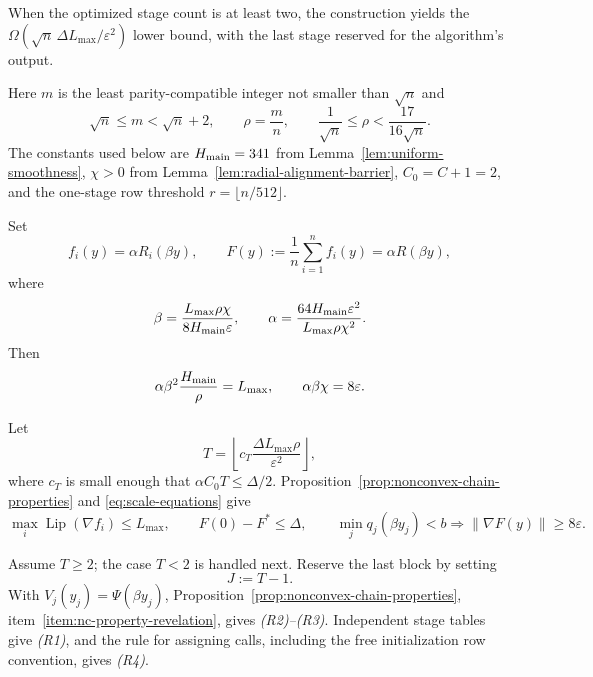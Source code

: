 \documentclass{article}
\theoremstyle{definition}
\begin{document}
When the optimized stage count is at least two, the construction yields the
$\Omega(\sqrt n\,\Delta L_{\max}/\varepsilon^2)$ lower bound, with the last
stage reserved for the algorithm's output.

Here $m$ is the least parity-compatible integer not smaller than $\sqrt n$ and
\begin{equation}
 \sqrt n\le m<\sqrt n+2,
 \qquad \rho=\frac mn,
 \qquad \frac1{\sqrt n}\le\rho<\frac{17}{16\sqrt n}.
 \label{eq:nonconvex-local-optimized-bias}
\end{equation}
The constants used below are $H_{\rm main}=341$ from
Lemma~\ref{lem:uniform-smoothness}, $\chi>0$ from
Lemma~\ref{lem:radial-alignment-barrier}, $C_0=C+1=2$, and the one-stage row
threshold $r=\lfloor n/512\rfloor$.

Set
\begin{equation}
    f_i(y)=\alpha R_i(\beta y),
    \qquad
    F(y):=\frac1n\sum_{i=1}^nf_i(y)=\alpha R(\beta y),
\end{equation}
where
\begin{equation}
    \beta=\frac{L_{\max}\rho\chi}{8H_{\rm main}\varepsilon},
 \qquad
    \alpha=\frac{64H_{\rm main}\varepsilon^2}{L_{\max}\rho\chi^2}.
 \label{eq:nonconvex-scales}
\end{equation}
Then
\begin{equation}
 \alpha\beta^2\frac {H_{\rm main}}\rho=L_{\max},
 \qquad
 \alpha\beta\chi=8\varepsilon.
 \label{eq:scale-equations}
\end{equation}

Let
\begin{equation}
 T=\left\lfloor
 c_T\frac{\Delta L_{\max}\rho}{\varepsilon^2}
 \right\rfloor,
 \label{eq:chain-length}
\end{equation}
where $c_T$ is small enough that $\alpha C_0T\le\Delta/2$.
Proposition~\ref{prop:nonconvex-chain-properties} and
\eqref{eq:scale-equations} give
\begin{equation}
 \max_i\operatorname{Lip}(\nabla f_i)\le L_{\max},
 \qquad F(0)-F^*\le\Delta,
 \qquad
 \min_jq_j(\beta y_j)<b\Longrightarrow
 \|\nabla F(y)\|\ge8\varepsilon.
 \label{eq:optimized-nonconvex-three-properties}
\end{equation}

Assume $T\ge2$; the case $T<2$ is handled next.  Reserve the
last block by setting
\begin{equation}
 J:=T-1.
 \label{eq:terminal-prefix}
\end{equation}
With $V_j(y_j)=\Psi(\beta y_j)$,
Proposition~\ref{prop:nonconvex-chain-properties}, item~\ref{item:nc-property-revelation},
gives \emph{(R2)--(R3)}.  Independent stage tables give \emph{(R1)}, and the
rule for assigning calls, including the free initialization row convention, gives
\emph{(R4)}.
\end{document}
